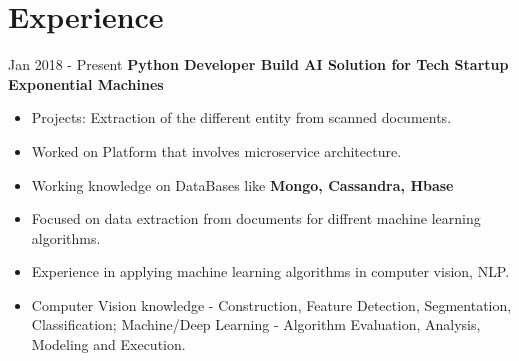 \documentclass[letterpaper]{twentysecondcv} %
\begin{document}
\makeprofile %
 

\section{Experience}

\begin{twenty} %
\twentyitem
    	{Jan 2018 -}
		{Present}
		{\textbf{Python Developer Build AI Solution for Tech Startup Exponential Machines}}
        {\href{http://www.xpms.io/}{}}
        {}
        {\begin{itemize}
        \item Projects: Extraction of the different entity from scanned documents.
	\item Worked on Platform that involves microservice architecture.
	\item Working knowledge on DataBases like \textbf{Mongo, Cassandra, Hbase}
        \item Focused on data extraction from documents for diffrent machine learning algorithms.
		\item  Experience in applying machine learning algorithms in computer vision, NLP.
		\item Computer Vision knowledge - Construction, Feature Detection, Segmentation, Classification; Machine/Deep Learning - Algorithm Evaluation, Analysis, Modeling and Execution.
        


\end{itemize}}
\end{twenty}
\end{document}

